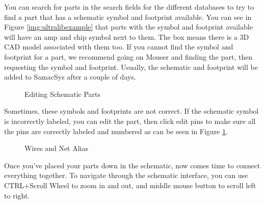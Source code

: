 You can search for parts in the search fields for the different databases to try to find a part that has a schematic symbol
and footprint available. You can see in Figure \ref{img:ultralibexample} that parts with the symbol and footprint available will
have an amp and chip symbol next to them. The box means there is a 3D CAD model associated with them too. If you cannot find
the symbol and footprint for a part, we recommend going on Mouser and finding the part, then requesting the symbol and footprint.
Usually, the schematic and footprint will be added to SamacSys after a couple of days.

\begin{figure}[H]
  \centering
\caption{Editing Schematic Parts}
\label{img:editpart}
\end{figure}

Sometimes, these symbols and footprints are not correct. If the schematic symbol is incorrectly labeled, you can edit the part,
then click edit pins to make sure all the pins are correctly labeled and numbered as can be seen in Figure \ref{img:editpart}.

\begin{figure}[H]
  \centering
\caption{Wires and Net Alias}
\label{img:wirealias}
\end{figure}

Once you've placed your parts down in the schematic, now comes time to connect everything together. To navigate through the
schematic interface, you can use CTRL+Scroll Wheel to zoom in and out, and middle mouse button to scroll left to right.

